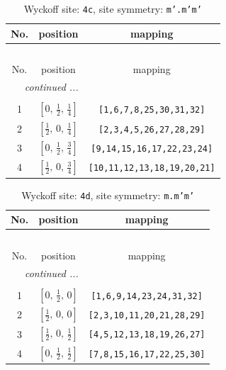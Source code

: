 \documentclass[fleqn,8pt]{jsarticle}
\begin{document}
\renewcommand{\arraystretch}{1.2}
\begin{longtable}{ccc}
\caption{Wyckoff site: {\tt 4c}, site symmetry: {\tt m'.m'm'}}
 \\
 \hline \hline
No. & position & mapping \\ \hline \endfirsthead

\multicolumn{2}{l}{\tablename\ \thetable{}} \\
 \hline \hline
No. & position & mapping \\ \hline \endhead

 \hline \hline
\multicolumn{2}{r}{\footnotesize\it continued ...} \\ \endfoot

 \hline \hline
\multicolumn{2}{r}{} \\ \endlastfoot

1 & $\left[ 0,\, \frac{1}{2},\, \frac{1}{4} \right]$ & {\tt [1,6,7,8,25,30,31,32]} \\ \hline
2 & $\left[ \frac{1}{2},\, 0,\, \frac{1}{4} \right]$ & {\tt [2,3,4,5,26,27,28,29]} \\ \hline
3 & $\left[ 0,\, \frac{1}{2},\, \frac{3}{4} \right]$ & {\tt [9,14,15,16,17,22,23,24]} \\ \hline
4 & $\left[ \frac{1}{2},\, 0,\, \frac{3}{4} \right]$ & {\tt [10,11,12,13,18,19,20,21]} \\
\end{longtable}
\renewcommand{\arraystretch}{1.2}
\begin{longtable}{ccc}
\caption{Wyckoff site: {\tt 4d}, site symmetry: {\tt m.m'm'}}
 \\
 \hline \hline
No. & position & mapping \\ \hline \endfirsthead

\multicolumn{2}{l}{\tablename\ \thetable{}} \\
 \hline \hline
No. & position & mapping \\ \hline \endhead

 \hline \hline
\multicolumn{2}{r}{\footnotesize\it continued ...} \\ \endfoot

 \hline \hline
\multicolumn{2}{r}{} \\ \endlastfoot

1 & $\left[ 0,\, \frac{1}{2},\, 0 \right]$ & {\tt [1,6,9,14,23,24,31,32]} \\ \hline
2 & $\left[ \frac{1}{2},\, 0,\, 0 \right]$ & {\tt [2,3,10,11,20,21,28,29]} \\ \hline
3 & $\left[ \frac{1}{2},\, 0,\, \frac{1}{2} \right]$ & {\tt [4,5,12,13,18,19,26,27]} \\ \hline
4 & $\left[ 0,\, \frac{1}{2},\, \frac{1}{2} \right]$ & {\tt [7,8,15,16,17,22,25,30]} \\
\end{longtable}
\end{document}
